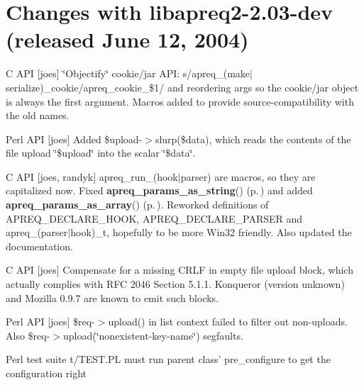 

\section{Changes with libapreq2-2.03-dev (released June 12, 2004)}\label{v2_03_dev}


\begin{CompactItemize}
\item 
C API [joes] \char`\"{}Objectify\char`\"{} cookie/jar API: s/apreq\_\-(make$|$serialize)\_\-cookie/apreq\_\-cookie\_\-\$1/ and reordering args so the cookie/jar object is always the first argument. Macros added to provide source-compatibility with the old names.\end{CompactItemize}
\begin{CompactItemize}
\item 
Perl API [joes] Added \$upload-$>$slurp(\$data), which reads the contents of the file upload \char`\"{}\$upload\char`\"{} into the scalar \char`\"{}\$data\char`\"{}.\end{CompactItemize}
\begin{CompactItemize}
\item 
C API [joes, randyk] apreq\_\-run\_\-(hook$|$parser) are macros, so they are capitalized now. Fixed {\bf apreq\_\-params\_\-as\_\-string}() {\rm (p.\,\pageref{group__params_a9})} and added {\bf apreq\_\-params\_\-as\_\-array}() {\rm (p.\,\pageref{group__params_a8})}. Reworked definitions of APREQ\_\-DECLARE\_\-HOOK, APREQ\_\-DECLARE\_\-PARSER  and apreq\_\-(parser$|$hook)\_\-t, hopefully to be more Win32 friendly. Also updated the documentation.\end{CompactItemize}
\begin{CompactItemize}
\item 
C API [joes] Compensate for a missing CRLF in empty file upload block, which  actually complies with RFC 2046 Section 5.1.1. Konqueror (version unknown) and Mozilla 0.9.7 are known to emit such blocks.\end{CompactItemize}
\begin{CompactItemize}
\item 
Perl API [joes] \$req-$>$upload() in list context failed to filter out non-uploads. Also \$req-$>$upload(\char`\"{}nonexistent-key-name\char`\"{}) segfaults.\end{CompactItemize}
\begin{CompactItemize}
\item 
Perl test suite t/TEST.PL must run parent class' pre\_\-configure to get the configuration right\end{CompactItemize}
